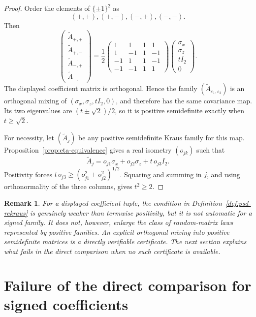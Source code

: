 \documentclass{article}
\newtheorem{remark}[theorem]{Remark}
\begin{document}
\begin{proof}
	Order the elements of $\{\pm1\}^2$ as
	\[
		(+,+),(+,-),(-,+),(-,-).
	\]
	Then
	\[
		\begin{pmatrix}
			\widetilde A_{+,+} \\
			\widetilde A_{+,-} \\
			\widetilde A_{-,+} \\
			\widetilde A_{-,-}
		\end{pmatrix}
		=
		\frac12
		\begin{pmatrix}
			1  & 1  & 1 & 1  \\
			1  & -1 & 1 & -1 \\
			-1 & 1  & 1 & -1 \\
			-1 & -1 & 1 & 1
		\end{pmatrix}
		\begin{pmatrix}
			\sigma_x \\
			\sigma_z \\
			tI_2     \\
			0
		\end{pmatrix}.
	\]
	The displayed coefficient matrix is orthogonal.  Hence the family
	$(\widetilde A_{\varepsilon_1,\varepsilon_2})$ is an orthogonal mixing of
	$(\sigma_x,\sigma_z,tI_2,0)$, and therefore has the same covariance map.  Its
	two eigenvalues are
	$(t\pm\sqrt2)/2$, so it is positive semidefinite exactly when
	$t\ge\sqrt2$.

	For necessity, let $(\widetilde A_j)$ be any positive semidefinite Kraus
	family for this map.  Proposition~\ref{prop:eta-equivalence} gives a real
	isometry $(o_{jk})$ such that
	\[
		\widetilde A_j
		=o_{j1}\sigma_x+o_{j2}\sigma_z+t\,o_{j3}I_2.
	\]
	Positivity forces
	$t\,o_{j3}\ge(o_{j1}^2+o_{j2}^2)^{1/2}$.  Squaring and summing in $j$, and
	using orthonormality of the three columns, gives $t^2\ge2$.
\end{proof}

\begin{remark}
	For a displayed coefficient tuple, the condition in
	Definition~\ref{def:psd-rekraus} is genuinely weaker than termwise
	positivity, but it is not automatic for a signed family.  It does not,
	however, enlarge the class of random-matrix laws represented by positive
	families.  An explicit orthogonal mixing into positive semidefinite matrices
	is a directly verifiable certificate.  The next section explains what fails
	in the direct comparison when no such certificate is available.
\end{remark}

\section{Failure of the direct comparison for signed coefficients}
\label{sec:signed}
\end{document}
